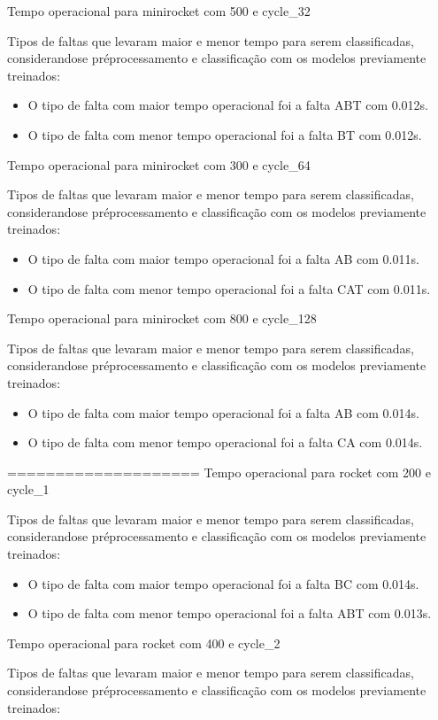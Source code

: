 Tempo operacional para minirocket com 500 e cycle_32
\item Tipos de faltas que levaram maior e menor tempo para serem classificadas, considerando\hyph se pré\hyph processamento e classificação com os modelos previamente treinados:
\begin{itemize}
\item O tipo de falta com maior tempo operacional foi a falta ABT com 0.012s.
\item O tipo de falta com menor tempo operacional foi a falta BT com 0.012s.
\end{itemize}
Tempo operacional para minirocket com 300 e cycle_64
\item Tipos de faltas que levaram maior e menor tempo para serem classificadas, considerando\hyph se pré\hyph processamento e classificação com os modelos previamente treinados:
\begin{itemize}
\item O tipo de falta com maior tempo operacional foi a falta AB com 0.011s.
\item O tipo de falta com menor tempo operacional foi a falta CAT com 0.011s.
\end{itemize}
Tempo operacional para minirocket com 800 e cycle_128
\item Tipos de faltas que levaram maior e menor tempo para serem classificadas, considerando\hyph se pré\hyph processamento e classificação com os modelos previamente treinados:
\begin{itemize}
\item O tipo de falta com maior tempo operacional foi a falta AB com 0.014s.
\item O tipo de falta com menor tempo operacional foi a falta CA com 0.014s.
\end{itemize}
====================
Tempo operacional para rocket com 200 e cycle_1
\item Tipos de faltas que levaram maior e menor tempo para serem classificadas, considerando\hyph se pré\hyph processamento e classificação com os modelos previamente treinados:
\begin{itemize}
\item O tipo de falta com maior tempo operacional foi a falta BC com 0.014s.
\item O tipo de falta com menor tempo operacional foi a falta ABT com 0.013s.
\end{itemize}
Tempo operacional para rocket com 400 e cycle_2
\item Tipos de faltas que levaram maior e menor tempo para serem classificadas, considerando\hyph se pré\hyph processamento e classificação com os modelos previamente treinados:
